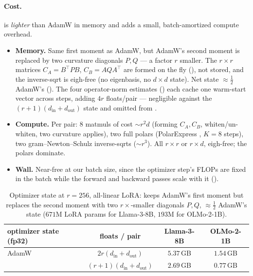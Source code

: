 \paragraph{Cost.} \methodname{} is \emph{lighter} than AdamW in memory and adds a small, batch-amortized compute overhead.
\begin{itemize}[leftmargin=1.5em,itemsep=1pt,topsep=2pt]
  \item \textbf{Memory.} Same first moment as AdamW, but AdamW's second moment is replaced by two curvature diagonals $P,Q$ --- a factor $r$ smaller. The $r\times r$ matrices $C_A=B^\top PB$, $C_B=AQA^\top$ are formed on the fly (), not stored, and the inverse-sqrt is eigh-free (no eigenbasis, no $d\times d$ state). Net state ${\approx}\tfrac12$ AdamW's (). The four operator-norm estimates () each cache one warm-start vector across steps, adding $4r$ floats/pair --- negligible against the $(r{+}1)(d_{\mathrm{in}}{+}d_{\mathrm{out}})$ state and omitted from .
  \item \textbf{Compute.} Per pair: $8$ matmuls of cost ${\sim}r^2d$ (forming $C_A,C_B$, whiten/un-whiten, two curvature applies), two full polars (PolarExpress \cite{polarexpress}, $K{=}8$ steps), two gram--Newton--Schulz inverse-sqrts \cite{gram_ns} (${\sim}r^3$). All $r\times r$ or $r\times d$, eigh-free; the polars dominate.
  \item \textbf{Wall.} Near-free at our batch size, since the optimizer step's FLOPs are fixed in the batch while the forward and backward passes scale with it ().
\end{itemize}
\begin{table}[h]
\centering\small
\begin{tabular}{lccc}
\toprule
optimizer state (fp32) & floats / pair & Llama-3-8B & OLMo-2-1B \\
\midrule
AdamW         & $2r(d_{\mathrm{in}}{+}d_{\mathrm{out}})$     & $5.37$\,GB & $1.54$\,GB \\
\methodname{} & $(r{+}1)(d_{\mathrm{in}}{+}d_{\mathrm{out}})$ & $2.69$\,GB & $0.77$\,GB \\
\bottomrule
\end{tabular}
\caption{Optimizer state at $r = 256$, all-linear LoRA: \methodname{} keeps AdamW's first moment but replaces the second moment with two $r{\times}$-smaller diagonals $P,Q$, ${\approx}\tfrac12$ AdamW's state ($671$M LoRA params for Llama-3-8B, $193$M for OLMo-2-1B).}
\label{tab:optstate}
\end{table}

